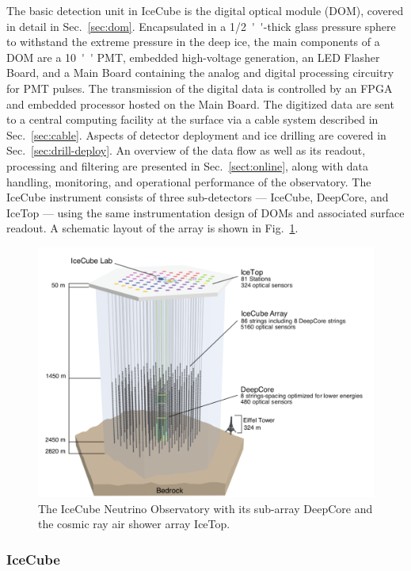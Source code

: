The basic detection unit in IceCube is the
digital optical module (DOM), covered in detail in Sec.~\ref{sec:dom}.
Encapsulated in a \SI{1/2}{''}-thick glass pressure sphere 
to withstand the extreme pressure in the deep ice, the main components of a DOM
are a \SI{10}{''} PMT, embedded high-voltage generation, an LED Flasher 
Board, and a Main Board containing the analog and digital processing circuitry
for PMT pulses.  The transmission of the digital data is controlled by an FPGA
and embedded processor hosted on the Main Board. The digitized data are sent to a
central computing facility at the surface via a cable system described in
Sec.~\ref{sec:cable}.  Aspects of detector deployment and ice drilling are
covered in Sec.~\ref{sec:drill-deploy}. An overview of the data flow as well as
its readout, processing and filtering are presented in
Sec.~\ref{sect:online}, along with data handling, monitoring, and operational performance of
the observatory. The IceCube instrument consists of three sub-detectors ---
IceCube, DeepCore, and IceTop --- using the same instrumentation design of
DOMs and associated surface readout. A schematic layout of the array is
shown in Fig.~\ref{fig:array}. 

\begin{figure}[!h]
 \centering
 \includegraphics[width=\textwidth]{graphics/intro/ArrayWSeasonsLabels_crop.pdf}
 \caption{The IceCube Neutrino Observatory with its sub-array DeepCore and
   the cosmic ray air shower array IceTop.}
 \label{fig:array}
\end{figure}

\subsubsection{IceCube}

